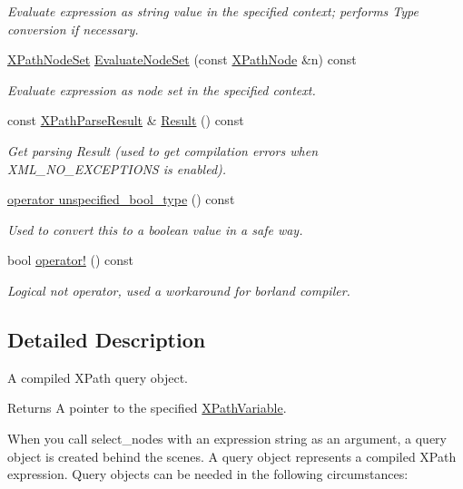 \begin{DoxyCompactItemize}
\begin{DoxyCompactList}\small\item\em Evaluate expression as string value in the specified context; performs Type conversion if necessary. \item\end{DoxyCompactList}\item 
\hyperlink{classphys_1_1xml_1_1XPathNodeSet}{XPathNodeSet} \hyperlink{classphys_1_1xml_1_1XPathQuery_af00ba3d0346ccc01f249274947191333}{EvaluateNodeSet} (const \hyperlink{classphys_1_1xml_1_1XPathNode}{XPathNode} \&n) const 
\begin{DoxyCompactList}\small\item\em Evaluate expression as node set in the specified context. \item\end{DoxyCompactList}\item 
const \hyperlink{structphys_1_1xml_1_1XPathParseResult}{XPathParseResult} \& \hyperlink{classphys_1_1xml_1_1XPathQuery_a83f2039e91105c9cd0dcc7d524359198}{Result} () const 
\begin{DoxyCompactList}\small\item\em Get parsing Result (used to get compilation errors when XML\_\-NO\_\-EXCEPTIONS is enabled). \item\end{DoxyCompactList}\item 
\hyperlink{classphys_1_1xml_1_1XPathQuery_a783704bb9a83379b6c8dadbfb5a835ce}{operator unspecified\_\-bool\_\-type} () const 
\begin{DoxyCompactList}\small\item\em Used to convert this to a boolean value in a safe way. \item\end{DoxyCompactList}\item 
bool \hyperlink{classphys_1_1xml_1_1XPathQuery_afe0b62e0ab607855f5267b0690bda33b}{operator!} () const 
\begin{DoxyCompactList}\small\item\em Logical not operator, used a workaround for borland compiler. \item\end{DoxyCompactList}\end{DoxyCompactItemize}


\subsection{Detailed Description}
A compiled XPath query object. \begin{DoxyReturn}{Returns}
A pointer to the specified \hyperlink{classphys_1_1xml_1_1XPathVariable}{XPathVariable}.
\end{DoxyReturn}
When you call select\_\-nodes with an expression string as an argument, a query object is created behind the scenes. A query object represents a compiled XPath expression. Query objects can be needed in the following circumstances: \par

